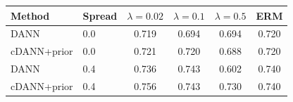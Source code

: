 \begin{tabular}{llcccc}
\toprule
Method & Spread & $\lambda{=}0.02$ & $\lambda{=}0.1$ & $\lambda{=}0.5$ & ERM \\
\midrule
DANN & 0.0 & 0.719 & 0.694 & 0.694 & 0.720 \\
cDANN+prior & 0.0 & 0.721 & 0.720 & 0.688 & 0.720 \\
DANN & 0.4 & 0.736 & 0.743 & 0.602 & 0.740 \\
cDANN+prior & 0.4 & 0.756 & 0.743 & 0.730 & 0.740 \\
\bottomrule
\end{tabular}